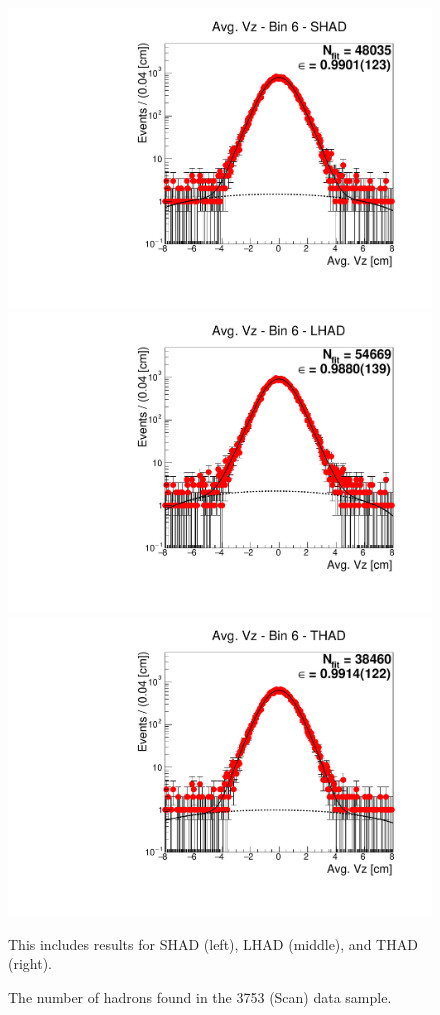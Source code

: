 \begin{figure}[H]
\centering
\includegraphics[scale=0.25]{figures/plots/nonDDbar_fit_results/scan/fit_scan_06_data_SHAD.pdf}
\hspace{-0.5cm}
\includegraphics[scale=0.25]{figures/plots/nonDDbar_fit_results/scan/fit_scan_06_data_LHAD.pdf}
\hspace{-0.5cm}
\includegraphics[scale=0.25]{figures/plots/nonDDbar_fit_results/scan/fit_scan_06_data_THAD.pdf}
\caption{The number of hadrons found in the 3753 (Scan) data sample.}
{This includes results for SHAD (left), LHAD (middle), and THAD (right).}
\label{fig:hadron_fits_scan_06}
\end{figure}


